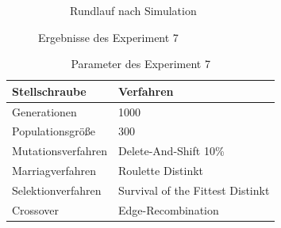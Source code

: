 \begin{figure}
\begin{subfigure}[Simulation]{0.49\textwidth}
		\caption{Rundlauf nach Simulation}
		\label{fig:experiment72}
	\end{subfigure}
\caption{Ergebnisse des Experiment 7}
\label{fig:experiment7}
\end{figure}



\begin{table}[H]
\centering
\caption{Parameter des Experiment 7}
\begin{tabular}{ll}
Stellschraube & Verfahren \\
\hline
Generationen & 1000 \\
Populationsgröße & 300 \\
Mutationsverfahren & Delete-And-Shift 10\% \\
Marriagverfahren & Roulette Distinkt \\
Selektionverfahren & Survival of the Fittest Distinkt \\
Crossover & Edge-Recombination
\end{tabular}
\label{tab:e7}
\end{table}

